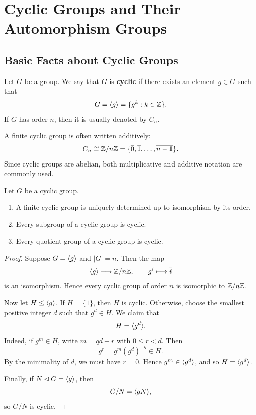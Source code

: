 \chapter{Cyclic Groups and Their Automorphism Groups}

\section{Basic Facts about Cyclic Groups}

\begin{definition}
Let $G$ be a group. We say that $G$ is \textbf{cyclic} if there exists an element
$g\in G$ such that
\[
    G=\langle g\rangle=\{g^k:k\in\mathbb{Z}\}.
\]
If $G$ has order $n$, then it is usually denoted by $C_n$.

A finite cyclic group is often written additively:
\[
    C_n\cong \mathbb{Z}/n\mathbb{Z}=\{\overline{0},\overline{1},\ldots,\overline{n-1}\}.
\]
Since cyclic groups are abelian, both multiplicative and additive notation are commonly used.
\end{definition}

\begin{proposition}
Let $G$ be a cyclic group.
\begin{enumerate}[label=(\arabic*)]
    \item A finite cyclic group is uniquely determined up to isomorphism by its order.
    \item Every subgroup of a cyclic group is cyclic.
    \item Every quotient group of a cyclic group is cyclic.
\end{enumerate}
\end{proposition}

\begin{proof}
Suppose $G=\langle g\rangle$ and $|G|=n$. Then the map
\[
    \langle g\rangle\longrightarrow \mathbb{Z}/n\mathbb{Z},\qquad g^i\longmapsto \overline{i}
\]
is an isomorphism. Hence every cyclic group of order $n$ is isomorphic to $\mathbb{Z}/n\mathbb{Z}$.

Now let $H\leq \langle g\rangle$. If $H=\{1\}$, then $H$ is cyclic. Otherwise, choose the smallest positive integer $d$ such that $g^d\in H$. We claim that
\[
    H=\langle g^d\rangle.
\]
Indeed, if $g^m\in H$, write $m=qd+r$ with $0\leq r<d$. Then
\[
    g^r=g^m(g^d)^{-q}\in H.
\]
By the minimality of $d$, we must have $r=0$. Hence $g^m\in\langle g^d\rangle$, and so $H=\langle g^d\rangle$.

Finally, if $N\lhd G=\langle g\rangle$, then
\[
    G/N=\langle gN\rangle,
\]
so $G/N$ is cyclic.
\end{proof}

